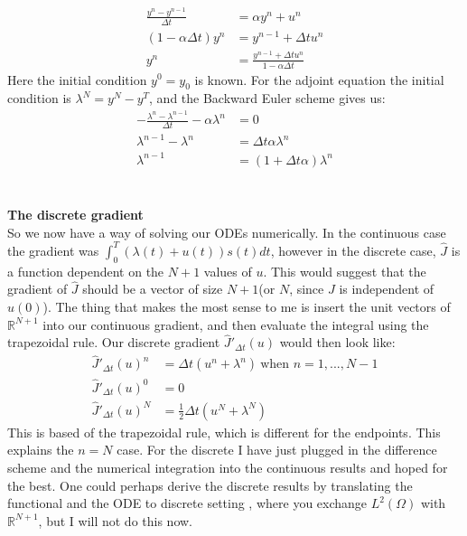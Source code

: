 \documentclass[11pt,a4paper]{report}
\begin{document}
\begin{align*}
\frac{y^n-y^{n-1}}{\Delta t} &= \alpha y^{n} + u^{n} \\
(1-\alpha\Delta t)y^{n} &= y^{n-1} +\Delta t u^{n} \\
y^n &=\frac{y^{n-1} +\Delta t u^{n}}{1-\alpha\Delta t}
\end{align*} 
Here the initial condition $y^0=y_0$ is known. For the adjoint equation the initial condition is $\lambda^N = y^N-y^T $, and the Backward Euler scheme gives us:
\begin{align*}
-\frac{\lambda^n-\lambda^{n-1}}{\Delta t} -\alpha\lambda^n &=0 \\
\lambda^{n-1} -\lambda^n &=\Delta t\alpha \lambda^n \\
\lambda^{n-1} &= (1+\Delta t\alpha)\lambda^n
\end{align*}
\\
\\
\textbf{The discrete gradient}
\\
So we now have a way of solving our ODEs numerically. In the continuous case the gradient was $\int_0^T(\lambda(t)+u(t))s(t)dt$, however in the discrete case, $\hat{J}$ is a function dependent on the $N+1$ values of $u$. This would suggest that the gradient of $\hat{J}$ should be a vector of size $N+1$(or $N$, since $J$ is independent of $u(0)$). The thing that makes the most sense to me is insert the unit vectors of $\mathbb{R}^{N+1}$ into our continuous gradient, and then evaluate the integral using the trapezoidal rule. Our discrete gradient $\hat{J}'_{\Delta t}(u)$ would then look like:
\begin{align*}
\hat{J}'_{\Delta t}(u)^n&=\Delta t(u^n+\lambda^n) \ \text{when $n=1,...,N-1$} \\
\hat{J}'_{\Delta t}(u)^0&=0 \\
\hat{J}'_{\Delta t}(u)^N&=\frac{1}{2}\Delta t(u^N+\lambda^N)
\end{align*} 
This is based of the trapezoidal rule, which is different for the endpoints. This explains the $n=N$ case. For the discrete I have just plugged in the difference scheme and the numerical integration into the continuous results and hoped for the best. One could perhaps derive the discrete results by translating the functional and the ODE to discrete setting , where you exchange $L^2(\Omega)$ with $\mathbb{R}^{N+1}$, but I will not do this now. 
\end{document}
